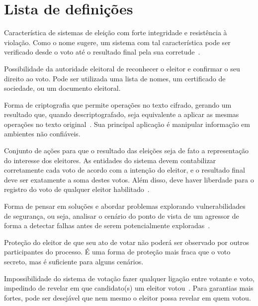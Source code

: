 \chapter*{Lista de definições}

\begin{description}[style=nextline]
	\item[Auditabilidade fim-a-fim] Característica de sistemas de eleição com forte integridade e resistência à violação. Como o nome sugere, um sistema com tal característica pode ser verificado desde o voto até o resultado final pela sua corretude~\cite{benaloh2015end}.

	\item[Autenticação] Possibilidade da autoridade eleitoral de reconhecer o eleitor e confirmar o seu direito ao voto. Pode ser utilizada uma lista de nomes, um certificado de sociedade, ou um documento eleitoral.
    
    \item[Criptografia homomórfica] Forma de criptografia que permite operações no texto cifrado, gerando um resultado que, quando descriptografado, seja equivalente a aplicar as mesmas operações no texto original~\cite{rivest2002lecture}. Sua principal aplicação é manipular informação em ambientes não confiáveis.

    \item[Integridade eleitoral] Conjunto de ações para que o resultado das eleições seja de fato a representação do interesse dos eleitores. As entidades do sistema devem contabilizar corretamente cada voto de acordo com a intenção do eleitor, e o resultado final deve ser exatamente a soma destes votos. Além disso, deve haver liberdade para o registro do voto de qualquer eleitor habilitado~\cite{alvim2015integridade}.
    
    \item[Mentalidade de segurança] Forma de pensar em soluções e abordar problemas explorando vulnerabilidades de segurança, ou seja, analisar o cenário do ponto de vista de um agressor de forma a detectar falhas antes de serem potencialmente exploradas~\cite{schneier2008inside}.
    
    \item[Voto privado] Proteção do eleitor de que seu ato de votar não poderá ser observado por outros participantes do processo. É uma forma de proteção mais fraca que o voto secreto, mas é suficiente para alguns cenários.
    
    \item[Voto secreto] Impossibilidade do sistema de votação fazer qualquer ligação entre votante e voto, impedindo de revelar em que candidato(s) um eleitor votou~\cite{delaune2006coercion}. Para garantias mais fortes, pode ser desejável que nem mesmo o eleitor possa revelar em quem votou.
\end{description}